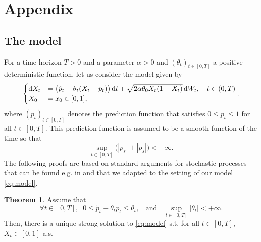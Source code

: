 \documentclass[11pt]{article}
\theoremstyle{definition}
\newtheorem{Thm}[Def]{Theorem}
\begin{document}


\section{Appendix} \label{Appendix}

\subsection{The model}
For a time horizon $T>0$ and  a parameter $\alpha > 0$ and $(\theta_t)_{t\in[0,T]}$ a positive deterministic  function,  let us consider the model  given by
\begin{equation}
\begin{cases}
\dif X_t &= \big(\dot p_t - \theta_t (X_t-p_t)  \big)\dif t  +\sqrt{2 \alpha \theta_0 X_t (1-X_t)} \dif W_t, \quad t\in(0,T) \\
X_0&= x_0\in [0,1],
\end{cases}.  \label{eq:model}
\end{equation}
where $(p_t)_{t\in[0,T]}$ denotes the prediction function that satisfies $0\le p_t\le 1$ for all $t\in[0,T]$. This prediction function is assumed to be a smooth function of the time so that 
$$\sup_{t\in[0,T]}\bigl( |p_s| + |\dot p_s|\big) <+\infty .$$
The following proofs are based on standard arguments for stochastic processes that can be found e.g. in \cite{Alf} and \cite{KarShr} that we adapted to the setting of our model \eqref{eq:model}.
\begin{Thm}\label{thm:exun}
Assume that    
\begin{equation}\label{Assumption:1}
\forall  t\in[0,T],\;\; 0\le \dot p_t +\theta_tp_t\le \theta_t, \;\;\mbox{ and }\;\;
\sup_{t\in[0,T]}|\theta_t|<+\infty\tag{A}. 
\end{equation}
Then, there is a unique strong solution to \eqref{eq:model} s.t.  for all $t\in[0,T]$, $X_t\in[0,1]$ a.s.
\end{Thm}
\end{document}
